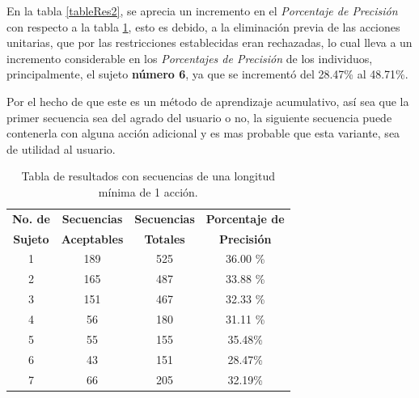  
En la tabla \ref{tableRes2}, se aprecia un incremento en el \emph{Porcentaje de 
 Precisi\'on} con respecto a la tabla \ref{tableRes1}, esto es debido, a la
 eliminaci\'on previa de las acciones unitarias, que por las restricciones 
 establecidas eran rechazadas, lo cual lleva a un incremento considerable en los
 \emph{Porcentajes de Precisi\'on} de los individuos, principalmente, el sujeto
 \textbf{n\'umero 6}, ya que se increment\'o del 28.47\% al 48.71\%. 

\newpage

Por el hecho de que este es un m\'etodo de aprendizaje acumulativo, as\'i sea
 que la primer secuencia sea del agrado del usuario o no, la siguiente 
 secuencia puede contenerla con alguna acci\'on adicional y es mas 
 probable que esta variante, sea de utilidad al usuario. 

 
\begin{table}[]
\centering
\begin{tabular}{cccc}
\hline
\textbf{No. de }	
&	\textbf{Secuencias }	
&   \textbf{Secuencias }	
&	\textbf{Porcentaje de }	\\

\textbf{Sujeto}
&	\textbf{Aceptables}
&	\textbf{Totales}
&	\textbf{Precisi\'on}
	\\ \hline

1				
&	189						
&	525						
&	36.00 \%		\\

2				
&	165						
&	487						
&	33.88 \%		\\

3
&	151
&	467
&	32.33 \%		\\

4
&	56
&	180
&	31.11 \%		\\

5
&	55
&	155
&	35.48\%			\\

6
&	43
&	151
&	28.47\%			\\

7
&	66
&	205
&	32.19\%			\\

\hline
\end{tabular}
\caption{Tabla de resultados con secuencias de una longitud m\'inima de 
 1 acci\'on.}
\label{tableRes1}
\end{table}



